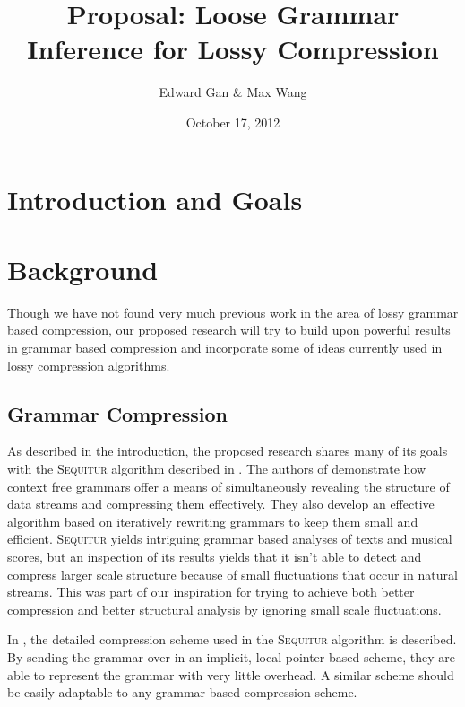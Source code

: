 \documentclass[11pt]{article}
\newcommand{\Sequitur}{\textsc{Sequitur}\xspace}
\begin{document}


\title{Proposal: Loose Grammar Inference for Lossy Compression}
\author{Edward Gan \& Max Wang}
\date{October 17, 2012}
\maketitle

\section{Introduction and Goals}

\section{Background}

Though we have not found very much previous work in the area of lossy grammar
based compression, our proposed research will try to build upon powerful
results in grammar based compression and incorporate some of ideas currently
used in lossy compression algorithms.

\subsection{Grammar Compression}

As described in the introduction, the proposed research shares many of its
goals with the \Sequitur algorithm described in \cite{sequitur}. The authors of
\cite{sequitur} demonstrate how context free grammars offer a means of
simultaneously revealing the structure of data streams and compressing them
effectively. They also develop an effective algorithm based on iteratively
rewriting grammars to keep them small and efficient. \Sequitur yields
intriguing grammar based analyses of texts and musical scores, but an
inspection of its results yields that it isn't able to detect and compress
larger scale structure because of small fluctuations that occur in natural
streams. This was part of our inspiration for trying to achieve both better
compression and better structural analysis by ignoring small scale
fluctuations.

In \cite{sequitur2}, the detailed compression scheme used in the \Sequitur
algorithm is described.  By sending the grammar over in an implicit,
local-pointer based scheme, they are able to represent the grammar with very
little overhead. A similar scheme should be easily adaptable to any grammar
based compression scheme.
\end{document}
